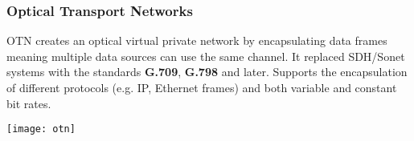 \newpage
\subsubsection{Optical Transport Networks}
OTN creates an optical virtual private network by encapsulating data frames meaning multiple data sources can use the same channel. It replaced SDH/Sonet systems with the standards \textbf{G.709}, \textbf{G.798} and later. Supports the encapsulation of different protocols (e.g. IP, Ethernet frames) and both variable and constant bit rates.

\begin{center}
	\texttt{[image: otn]}
\end{center}